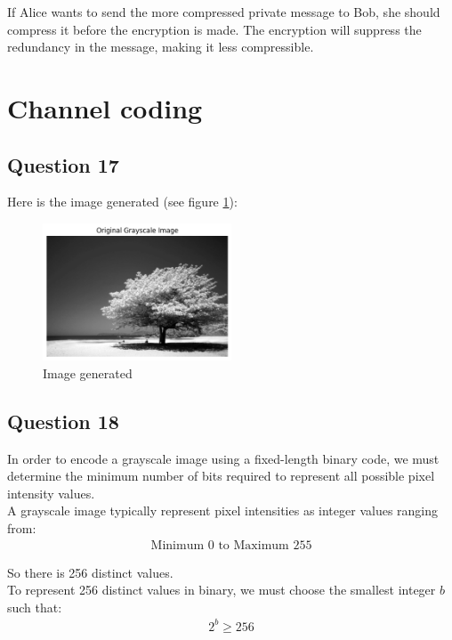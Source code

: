 \documentclass[]{template}
\begin{document}
    If Alice wants to send the more compressed private message to Bob, 
    she should compress it before the encryption is made. The encryption will suppress
    the redundancy in the message, making it less compressible.

\section{Channel coding}

    \subsection{Question 17}

    Here is the image generated (see figure \ref{fig:image}): 
    \begin{figure}[ht]
        \centering
        \includegraphics[width=0.5\textwidth]{Images/image.png}
        \caption{Image generated}\label{fig:image}
    \end{figure}

    \subsection{Question 18}

    In order to encode a grayscale image using a fixed-length binary code,
    we must determine the minimum number of bits required to represent all possible 
    pixel intensity values.\\

    \noindent
    A grayscale image typically represent pixel intensities as integer values 
    ranging from:
    \begin{align*}
        \text{Minimum } 0 \text{ to Maximum } 255
    \end{align*}

    \noindent
    So there is 256 distinct values.\\

    \noindent
    To represent 256 distinct values in binary, we must choose the smallest integer $b$ such that:
    \begin{align*}
        2^b \geq 256
    \end{align*}
\end{document}
